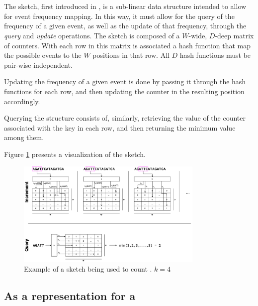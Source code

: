 \section{\cm}
\label{sec:countmin}

The \cm sketch, first introduced in \cite{Cormode2005}, is a sub-linear data structure intended to allow for event frequency mapping.
In this way, it must allow for the query of the frequency of a given event, as well as the update of that frequency, through the
\emph{query} and \emph{update} operations. The sketch is composed of a $W$-wide, $D$-deep matrix of counters. With each row in this
matrix is associated a hash function that map the possible events to the $W$ positions in that row. All $D$ hash functions
must be pair-wise independent.

Updating the frequency of a given event is done by passing it through the hash functions for each row, and then updating the counter in
the resulting position accordingly.

Querying the structure consists of, similarly, retrieving the value of the counter associated with the key in each row, and then returning
the minimum value among them.

Figure \ref{fig:countminexample} presents a visualization of the \cm sketch.


\begin{figure}[htbp]
	\begin{center}
    \includegraphics[width=0.8\textwidth]{figures/cm-example}
	\end{center}
	\caption{Example of a \cm sketch being used to count \kmers. $k=4$}\label{fig:countminexample}
\end{figure}

\subsection{As a representation for a \dBG}


